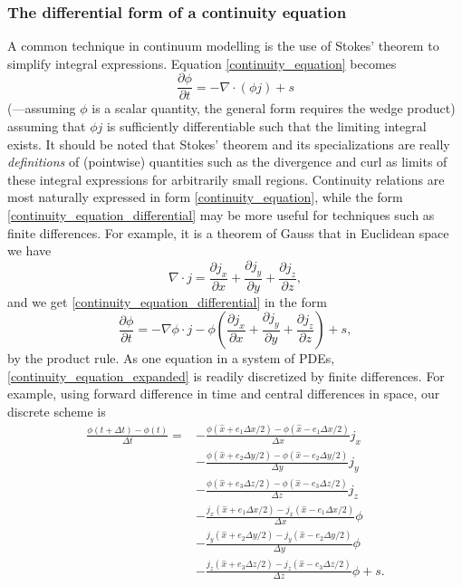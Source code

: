 \documentclass[11pt,a4paper]{memoir}
\newcommand{\Part}[2]{\frac{\partial #1}{\partial #2}}
\begin{document}
\subsubsection{The differential form of a continuity equation}
A common technique in continuum modelling is the use of Stokes' theorem to simplify integral expressions.
Equation \eqref{continuity_equation} becomes
\begin{equation}\label{continuity_equation_differential}
    \Part{\phi}{t} = -\nabla\cdot (\phi j) + s
\end{equation}
(---assuming $\phi$ is a scalar quantity, the general form requires the wedge product) assuming that $\phi j$ is sufficiently differentiable such that the limiting integral exists.
It should be noted that Stokes' theorem and its specializations are really \textit{definitions} of (pointwise) quantities
such as the divergence and curl as limits of these integral expressions for arbitrarily small regions.
Continuity relations are most naturally expressed in form \eqref{continuity_equation}, while the form
\eqref{continuity_equation_differential} may be more useful for techniques such as finite differences.
For example, it is a theorem of Gauss that in Euclidean space we have
\begin{equation}\label{gauss_euclidean_divergence}
    \nabla \cdot j = \Part{j_x}{x} + \Part{j_y}{y} + \Part{j_z}{z},
\end{equation}
and we get \eqref{continuity_equation_differential} in the form
\begin{equation}\label{continuity_equation_expanded}
    \Part{\phi}{t} = -\nabla \phi \cdot j - \phi\left(\Part{j_x}{x} + \Part{j_y}{y} + \Part{j_z}{z}\right) + s,
\end{equation}
by the product rule.
As one equation in a system of PDEs, \eqref{continuity_equation_expanded} is readily discretized by finite differences. For example, using forward difference in time and
central differences in space, our discrete scheme is
\begin{equation}\label{continuity_equation_finite_differences}
\begin{split}
    \frac{\phi(t + \Delta t) - \phi(t)}{\Delta t} = &-\frac{\phi(\hat{x} + e_1\Delta x/2) - \phi(\hat{x} - e_1\Delta x/2)}{\Delta x}j_x \\
                                                    &-\frac{\phi(\hat{x} + e_2\Delta y/2) - \phi(\hat{x} - e_2\Delta y/2)}{\Delta y}j_y \\
                                                    &-\frac{\phi(\hat{x} + e_3\Delta z/2) - \phi(\hat{x} - e_3\Delta z/2)}{\Delta z}j_z \\
                                                    &-\frac{j_x(\hat{x} + e_1\Delta x/2) - j_x(\hat{x} - e_1\Delta x/2)}{\Delta x}\phi \\
                                                    &-\frac{j_y(\hat{x} + e_2\Delta y/2) - j_y(\hat{x} - e_2\Delta y/2)}{\Delta y}\phi \\
                                                    &-\frac{j_z(\hat{x} + e_3\Delta z/2) - j_z(\hat{x} - e_3\Delta z/2)}{\Delta z}\phi +s.
\end{split}
\end{equation}
\end{document}
